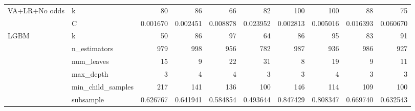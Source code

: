 \documentclass[12pt,twoside]{report}
\begin{document}
\begin{longtable}{llrrrrrrrr}
\midrule
\multirow{2}{*}{VA+LR+No odds}    & k                          & 80                       & 86                       & 66                       & 82                       & 100                      & 100                      & 88                       & 75                        \\*
                                  & C                          & 0.001670                 & 0.002451                 & 0.008878                 & 0.023952                 & 0.002813                 & 0.005016                 & 0.016393                 & 0.060670                  \\* 
\midrule
\multirow{10}{*}{LGBM}            & k                          & 50                       & 86                       & 97                       & 64                       & 86                       & 95                       & 83                       & 91                        \\*
                                  & n\_estimators              & 979                      & 998                      & 956                      & 782                      & 987                      & 936                      & 986                      & 927                       \\*
                                  & num\_leaves                & 15                       & 9                        & 22                       & 31                       & 8                        & 19                       & 9                        & 11                        \\*
                                  & max\_depth                 & 3                        & 4                        & 4                        & 3                        & 3                        & 4                        & 3                        & 3                         \\*
                                  & min\_child\_samples        & 217                      & 141                      & 136                      & 100                      & 146                      & 114                      & 109                      & 100                       \\*
                                  & subsample                  & 0.626767                 & 0.641941                 & 0.584854                 & 0.493644                 & 0.847429                 & 0.808347                 & 0.669740                 & 0.632543                  \\*

\end{longtable}
\end{document}
